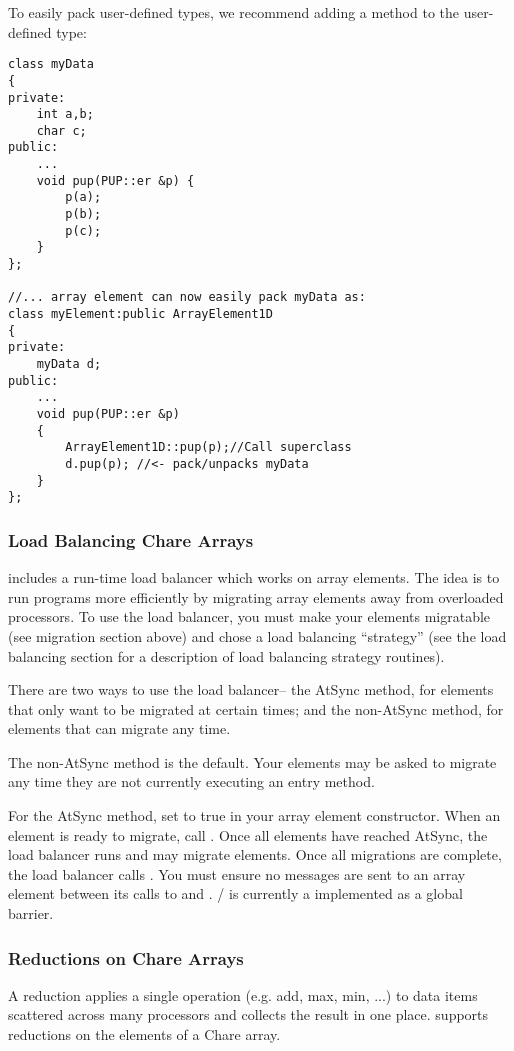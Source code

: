 To easily pack user-defined types, we recommend adding
a  method to the user-defined type:

\begin{verbatim}
class myData 
{
private:
    int a,b;
    char c;
public:
    ...
    void pup(PUP::er &p) {
        p(a);
        p(b);
        p(c);
    }
};

//... array element can now easily pack myData as:
class myElement:public ArrayElement1D 
{
private:
    myData d;
public:
    ...
    void pup(PUP::er &p)
    {
        ArrayElement1D::pup(p);//Call superclass
        d.pup(p); //<- pack/unpacks myData
    }
};
\end{verbatim}


\subsubsection{Load Balancing Chare Arrays}
\charmpp includes a run-time load balancer which works
on array elements.  The idea is to run programs more efficiently
by migrating array elements away from overloaded processors.
To use the load balancer, you must make your elements migratable
(see migration section above) and chose a load balancing 
``strategy'' (see the load balancing section for a description
of load balancing strategy routines).

There are two ways to use the load balancer-- the AtSync
method, for elements that only want to be migrated at certain
times; and the non-AtSync method, for elements that can migrate
any time.

The non-AtSync method is the default.  Your elements may be
asked to migrate any time they are not currently executing
an entry method.

For the AtSync method, set  to true in your 
array element constructor.  When an element is ready to migrate,
call .  Once all elements have reached AtSync, 
the load balancer runs and may migrate elements.  Once
all migrations are complete, the load balancer calls 
.  You must ensure no messages are
sent to an array element between its calls to  and
. / is currently
a implemented as a global barrier.



\subsubsection{Reductions on Chare Arrays}
A reduction applies a single operation (e.g. add,
max, min, ...) to data items scattered across many processors and
collects the result in one place.  \charmpp supports reductions on the
elements of a Chare array.

